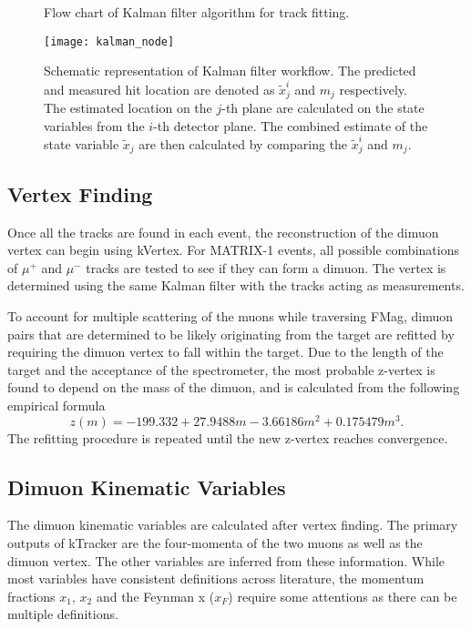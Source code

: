 \documentclass[../main.tex]{subfiles}
\begin{document}
\begin{figure}
	\centering
	
	\caption{Flow chart of Kalman filter algorithm for track fitting.}
	\label{fig:kalman_flowchart}
\end{figure}

\begin{figure}
	\centering
	\texttt{[image: kalman\_node]}
	\caption{Schematic representation of Kalman filter workflow. The predicted and measured hit location
		are denoted as $\tilde{x}^i_j$ and $m_j$ respectively. The estimated location on the $j$-th plane
		are calculated on the state variables from the $i$-th detector plane. The combined estimate of the
		state variable $\tilde{x}_j$ are then calculated by comparing the $\tilde{x}^i_j$ and $m_j$.}
	\label{fig:kalman_node}
\end{figure}

\subsection{Vertex Finding}
Once all the tracks are found in each event, the reconstruction of the dimuon vertex can begin using kVertex.
For MATRIX-1 events, all possible combinations of $\mu^+$ and $\mu^-$ tracks are tested to see if they can form
a dimuon. The vertex is determined using the same Kalman filter with the tracks acting as measurements.

To account for multiple scattering of the muons while traversing FMag, dimuon pairs that are
determined to be likely originating from the target are refitted by requiring the dimuon vertex to
fall within the target. Due to the length of the target and the acceptance of the spectrometer,
the most probable z-vertex is found to depend on the mass of the dimuon, and is calculated from the
following empirical formula~\cite{kun-1283}
\begin{equation}
	z\left(m\right) = -199.332 + 27.9488 m - 3.66186 m^2 + 0.175479 m^3.
\end{equation}
The refitting procedure is repeated until the new z-vertex reaches convergence.


\subsection{Dimuon Kinematic Variables}
\label{subsec:def_kinematic}
The dimuon kinematic variables are calculated after vertex finding. The primary outputs of kTracker
are the four-momenta of the two muons as well as the dimuon vertex. The other variables are inferred
from these information. While most variables have consistent definitions across literature, the momentum
fractions $x_1$, $x_2$ and the Feynman x ($x_F$) require some attentions as there can be multiple definitions.
\end{document}
